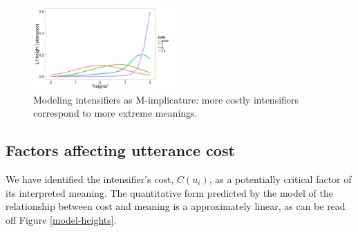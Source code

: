 \documentclass[10pt,letterpaper]{article}
\newcommand{\todo}[1]{{\color{red}#1}}
\begin{document}
\begin{figure}[ht]
\begin{center}
\includegraphics[width=0.48\textwidth]{analysis_files_for_writeup/images/model_results.png}
\end{center}
\caption{Modeling intensifiers as M-implicature: more costly intensifiers correspond to more extreme meanings.} 
\label{model}
\end{figure}

% 
\subsection{Factors affecting utterance cost}

We have identified the intensifier's cost, $C(u_{i})$, as a potentially critical factor of its interpreted meaning. The quantitative form predicted by the model of the relationship between cost and meaning is a approximately linear, as can be read off Figure \ref{model-heights}.
\end{document}
